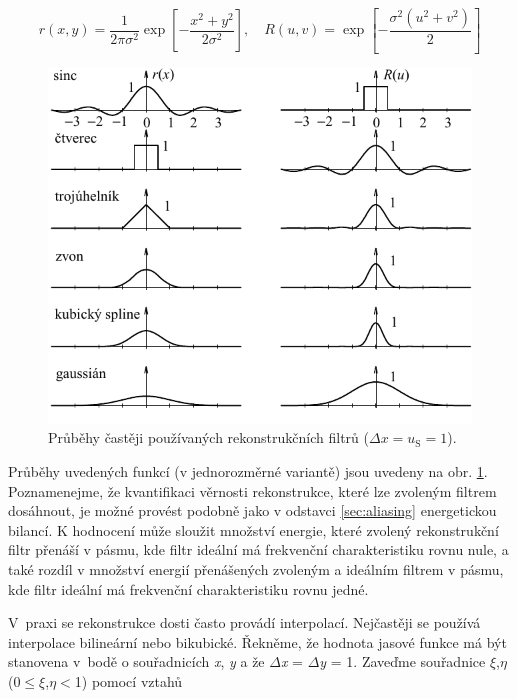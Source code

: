 \begin{equation} \label{eq:4_38ab}
    r \left(x, y\right) = \frac{1}{2 \pi \sigma^2} \exp \left[ - \frac{x^2 + y^2}{2\sigma^2}\right], \quad R(u, v) = \exp \left[ - \frac{\sigma^2( u^2 + v^2)}{2}\right]
\end{equation}

\begin{figure}[th]
    \begin{center}
        \includegraphics[scale=1.0]{04_digitalizace/images/img_4_6.pdf}
    \end{center}
    \caption{Průběhy častěji používaných rekonstrukčních filtrů ($\Delta x = u_{\mathrm{S}} = 1$).}
    \label{img:4_6}
\end{figure}

Průběhy uvedených funkcí (v jednorozměrné variantě) jsou uvedeny na obr. \ref{img:4_6}. Poznamenejme, že kvantifikaci věrnosti rekonstrukce, které lze zvoleným filtrem dosáhnout, je možné provést podobně jako v odstavci \ref{sec:aliasing} energetickou bilancí. K hodnocení může sloužit množství energie, které zvolený rekonstrukční filtr přenáší v pásmu, kde filtr ideální má frekvenční charakteristiku rovnu nule, a také rozdíl v množství energií přenášených zvoleným a ideálním filtrem v pásmu, kde filtr ideální má frekvenční charakteristiku rovnu jedné.

V~praxi se rekonstrukce dosti často provádí interpolací. Nejčastěji se používá interpolace bilineární nebo bikubické. Řekněme, že hodnota jasové funkce má být stanovena v~bodě o souřadnicích \textit{x}, \textit{y} a že $\Delta$\textit{x} = $\Delta$\textit{y} = 1. Zaveďme souřadnice $\xi$,$\eta$ (0$\leq$$\xi$,$\eta$$<$1) pomocí vztahů

